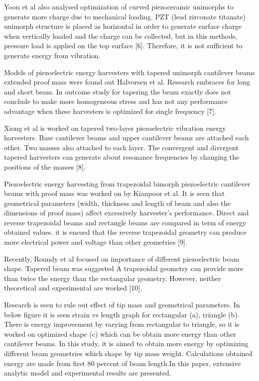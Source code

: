 \documentclass{article}
\begin{document}
Yoon et al also analysed optimization of curved piezoceramic unimorphs to generate more charge due to mechanical loading. PZT (lead zirconate titanate) unimorph structure is placed as horizontal in order to generate surface charge when vertically loaded and the charge can be collected, but in this methods, pressure load is applied on the top surface [6]. Therefore, it is not sufficient to generate energy from vibration. 

Models of piezoelectric energy harvesters with tapered unimorph cantilever beams extended proof mass were found out Halvorsen et al. Research embraces for long and short beam. In outcome study for tapering the beam exactly does not conclude to make more homogeneous stress and has not any performance advantage when these harvesters is optimized for single frequency [7]. 

Xiong et al is worked on tapered two-layer piezoelectric vibration energy harvesters. Base cantilever beams and upper cantilever beams are attached each other. Two masses also attached to each layer. The convergent and divergent tapered harvesters can generate about resonance frequencies by changing the positions of the masses [8]. 

Piezoelectric energy harvesting from trapezoidal bimorph piezoelectric cantilever beams with proof mass was worked on by Kianpoor et al. It is seen that geometrical parameters (width, thickness and length of beam and also the dimensions of proof mass) affect excessively harvester’s performance. Direct and reverse trapezoidal beams and rectangle beams are compared in term of energy obtained values. it is ensued that the reverse trapezoidal geometry can produce more electrical power and voltage than other geometries [9]. 

Recently, Roundy et al focused on importance of different piezoelectric beam shape. Tapered beam was suggested A trapezoidal geometry can provide more than twice the energy than the rectangular geometry. However, neither theoretical and experimental are worked [10]. 

Research is seen to rule out effect of tip mass and geometrical parameters. In below figure it is seen strain vs length graph for rectangular (a), triangle (b). There is energy improvement by varying from rectangular to triangle, so it is worked on optimized shape (c) which can be obtain more energy than other cantilever beams. In this study, it is aimed to obtain more energy by optimizing different beam geometries which shape by tip mass weight. Calculations obtained energy are made  from first 80 percent of beam length.In this paper, extensive analytic model and experimental results are presented.
\end{document}
